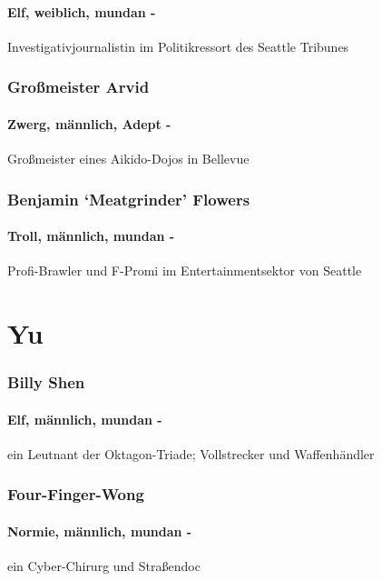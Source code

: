     \paragraph{Elf, weiblich, mundan -} Investigativjournalistin im Politikressort des Seattle Tribunes
    
    \subsubsection{Großmeister Arvid}
    \paragraph{Zwerg, männlich, Adept -} Großmeister eines Aikido-Dojos in Bellevue
    
    \subsubsection{Benjamin ‘Meatgrinder’ Flowers}
    \paragraph{Troll, männlich, mundan -} Profi-Brawler und F-Promi im Entertainmentsektor von Seattle


\section{Yu}

    \subsubsection{Billy Shen}
    \paragraph{Elf, männlich, mundan -} ein Leutnant der Oktagon-Triade; Vollstrecker und Waffenhändler
    
    \subsubsection{Four-Finger-Wong}
    \paragraph{Normie, männlich, mundan -} ein Cyber-Chirurg und Straßendoc
    
